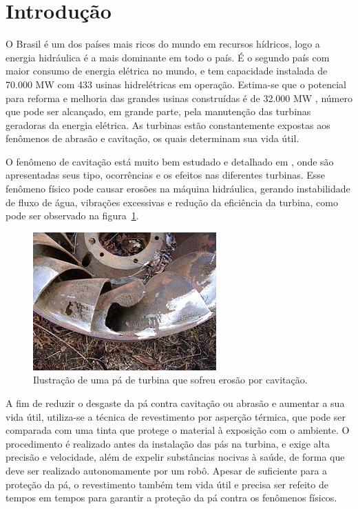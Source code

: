\section{Introdução}
O Brasil é um dos países mais ricos do mundo em recursos hídricos, logo a
energia hidráulica é a mais dominante em todo o país. É o segundo país
com maior consumo de energia elétrica no mundo, e tem capacidade instalada de
70.000 MW com 433 usinas hidrelétricas em operação. Estima-se que o potencial para reforma e
melhoria das grandes usinas construídas é de 32.000 MW
\citep{goldemberg2007energia}, número que pode ser alcançado, em grande parte,
pela manutenção das turbinas geradoras da energia elétrica. As turbinas estão
constantemente expostas aos fenômenos de abrasão e cavitação, os quais
determinam sua vida útil.

O fenômeno de cavitação está muito bem estudado e detalhado em
\cite{escaler2006detection}, onde são apresentadas seus tipo, ocorrências e os
efeitos nas diferentes turbinas. Esse fenômeno físico pode causar erosões na
máquina hidráulica, gerando instabilidade de fluxo de água, vibrações excessivas
e redução da eficiência da turbina, como pode ser observado na
figura~\ref{fig::cavitacao}.

\begin{figure}[h!]	
	\includegraphics[width=\columnwidth]{figs/intro/cavitacao}
	\caption{Ilustração de uma pá de turbina que sofreu erosão por cavitação.}
	\label{fig::cavitacao}
\end{figure}

A fim de reduzir o desgaste da pá contra cavitação ou abrasão e aumentar a sua
vida útil, utiliza-se a técnica de revestimento por asperção térmica, que pode ser comparada com uma
tinta que protege o material à exposição com o ambiente. O procedimento é realizado
antes da instalação das pás na turbina, e exige alta precisão e velocidade, além
de expelir substâncias nocivas à saúde, de forma que deve ser realizado
autonomamente por um robô. Apesar de suficiente para a proteção da pá, o
revestimento também tem vida útil e precisa ser refeito de tempos em tempos para
garantir a proteção da pá contra os fenômenos físicos.


